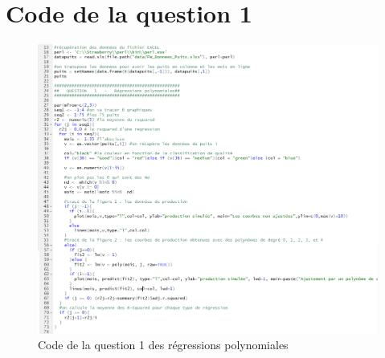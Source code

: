 \documentclass[12pt]{article}
\begin{document}
\section{Code de la question 1}
\begin{figure}[H]
 \centering %
	\includegraphics[width=450px]{code_q1}
  \caption{\label{fig:code_q1} Code de la question 1 des r\'egressions polynomiales}
\end{figure}
\end{document}
